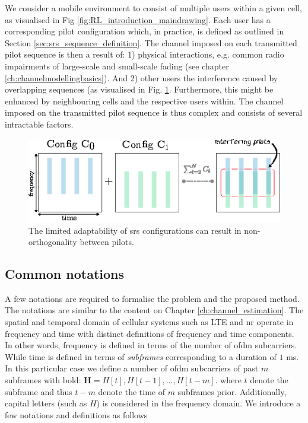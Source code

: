 We consider a mobile environment to consist of multiple users within a given cell, as visualised in Fig \ref{fig:RL_introduction_maindrawing}. Each user has a corresponding pilot configuration which, in practice, is defined as outlined in Section \ref{sec:srs_sequence_definition}. The channel imposed on each transmitted pilot sequence is then a result of:  1) physical interactions, e.g. common radio impairments of large-scale and small-scale fading (see chapter \ref{ch:channelmodellingbasics}). And 2) other users the interference caused by overlapping sequences (as visualised in Fig. \ref{fig:RL_srs_configuration_overlap}. Furthermore, this might be enhanced by neighbouring cells and the respective users within. The channel imposed on the transmitted pilot sequence is thus complex and consists of several intractable factors. 

\begin{figure}
    \centering
    \includegraphics{chapters/part_uplink/figures/RL_srs_configuration_overlap.eps}
    \caption{The limited adaptability of \gls{srs} configurations can result in non-orthogonality between pilots.}\label{fig:RL_srs_configuration_overlap}
\end{figure}


\subsection{Common notations}
A few notations are required to formalise the problem and the proposed method. The notations are similar to the content on Chapter \ref{ch:channel_estimation}. The spatial and temporal domain of cellular systems such as LTE and \gls{nr} operate in frequency and time with distinct definitions of frequency and time components. In other words, frequency is defined in terms of the number of \gls{ofdm} subcarriers. While time is defined in terms of \emph{subframes} corresponding to a duration of $1$ ms. In this particular case we define a number of \gls{ofdm} subcarriers of past $m$ subframes with bold: $\mathbf{H} = H[t],H[t-1],...,H[t-m]$. where $t$ denote the subframe and thus $t - m$ denote the time of $m$ subframes prior. Additionally, capital letters (such as $H$) is considered in the frequency domain. We introduce a few notations and definitions as follows

